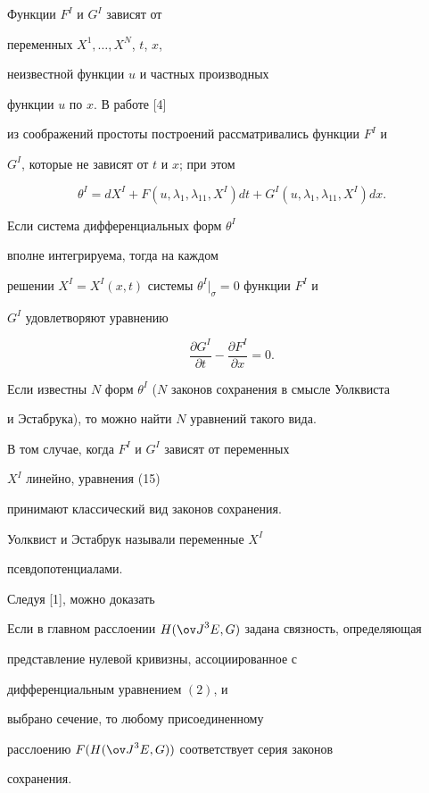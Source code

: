 Функции $F^I$ и $G^I$ зависят от


переменных $X^1,\dotsc,X^N$, $t$, $x$, 


неизвестной функции $u$ и частных производных


функции $u$ по $x$. В работе [4]


из соображений простоты построений рассматривались функции $F^I$ и


$G^I$, которые не зависят от $t$ и $x$; при этом


$$


\theta^I=dX^I+F(u,\lambda_1,\lambda_{11},X^I)dt+


G^I(u,\lambda_1,\lambda_{11},X^I)dx.


$$


Если система дифференциальных форм $\theta^I$ 


вполне интегрируема, тогда на каждом


решении $X^I=X^I(x,t)$ системы $\theta^I|_\sigma=0$ функции $F^I$ и


$G^I$ удовлетворяют уравнению


\begin{equation}


\frac{\partial G^I}{\partial t}-\frac{\partial F^I}{\partial x}=0.


\end{equation}


Если известны $N$ форм $\theta^I$ ($N$ законов сохранения в смысле Уолквиста


и Эстабрука), то можно найти $N$ уравнений такого вида.


В том случае, когда $F^I$ и $G^I$ зависят от переменных


$X^I$ линейно, уравнения (15)


принимают классический вид законов сохранения. 


Уолквист и Эстабрук называли переменные $X^I$ {\it


псевдопотенциалами.}





Следуя [1], можно доказать





\begin{propnonum}


Если в главном расслоении $H({\ov J}^{3}E,G)$ задана связность, определяющая


представление нулевой кривизны, ассоциированное с


дифференциальным уравнением $(2)$, и


выбрано сечение, то любому присоединенному 


расслоению $F(H({\ov J}^{3}E,G))$ соответствует серия законов


сохранения.


\end{propnonum}





